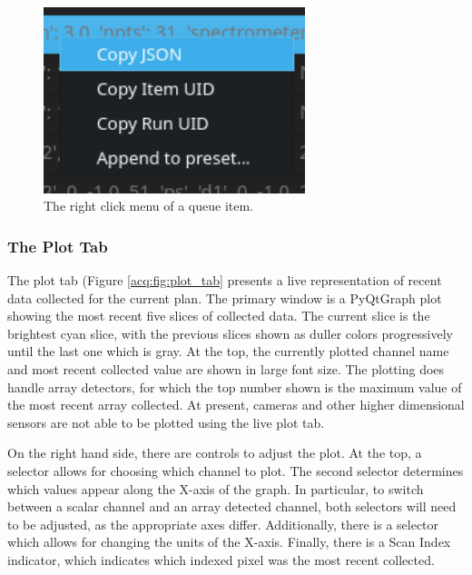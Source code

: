 \begin{figure}
\includegraphics[width=3in]{"acquisition/images/right_click_menu"}
\caption[Right click menu]{
	The right click menu of a queue item.
}
\label{acq:fig:right_click}
\end{figure}

\subsubsection{The Plot Tab}

The plot tab (Figure \ref{acq:fig:plot_tab} presents a live representation of recent data collected for the current plan.
The primary window is a PyQtGraph\cite{pyqtgraph} plot showing the most recent five slices of collected data.
The current slice is the brightest cyan slice, with the previous slices shown as duller colors progressively until the last one which is gray.
At the top, the currently plotted channel name and most recent collected value are shown in large font size.
The plotting does handle array detectors, for which the top number shown is the maximum value of the most recent array collected.
At present, cameras and other higher dimensional sensors are not able to be plotted using the live plot tab.

On the right hand side, there are controls to adjust the plot.
At the top, a selector allows for choosing which channel to plot.
The second selector determines which values appear along the X-axis of the graph.
In particular, to switch between a scalar channel and an array detected channel, both selectors will need to be adjusted, as the appropriate axes differ.
Additionally, there is a selector which allows for changing the units of the X-axis.
Finally, there is a Scan Index indicator, which indicates which indexed pixel was the most recent collected.

